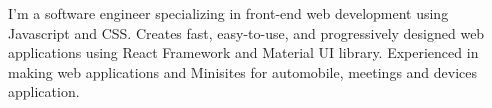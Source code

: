 

\begin{cvparagraph}

I'm a software engineer specializing in front-end web development using Javascript and CSS. Creates fast, easy-to-use, and progressively designed web applications using React Framework and Material UI library. Experienced in making web applications and Minisites for automobile, meetings and devices application.
\end{cvparagraph}
